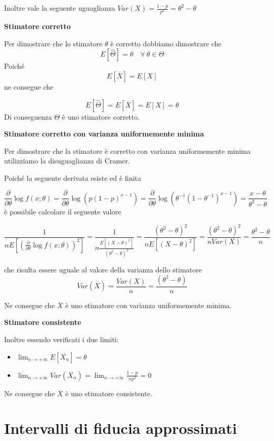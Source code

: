 \documentclass[]{book}
\providecommand{\tightlist}{%
  \setlength{\itemsep}{0pt}\setlength{\parskip}{0pt}}
\begin{document}
Inoltre vale la seguente uguaglianza
\(Var(X) = \frac{1-p}{p^2} = \theta^2 - \theta\)

\textbf{Stimatore corretto}

Per dimostrare che lo stimatore \(\theta\) è corretto dobbiamo
dimostrare che
\[E[\hat \Theta] = \theta \quad \forall \ \theta \in \Theta\] Poiché
\[E[\overline{X}] = E[X]\] ne consegue che

\[E[\hat \Theta] = E[\overline{X}] = E[X] = \theta\] Di conseguenza
\(\Theta\) è uno stimatore corretto.

\textbf{Stimatore corretto con varianza uniformemente minima}

Per dimostrare che la stimatore è corretto con varianza uniformemente
minima utilizziamo la disuguaglianza di Cramer.

Poiché la seguente derivata esiste ed è finita

\[\frac{\partial}{\partial \theta} \log f(x; \theta) = \frac{\partial}{\partial \theta} \log(p(1-p)^{x-1})= \frac{\partial}{\partial \theta} \log{(\theta^{-1}(1-\theta^{-1})^{x-1})} =\frac{x - \theta}{\theta^2 -  \theta}\]
è possibile calcolare il seguente valore

\[\frac{1}{n E \left[ \left( \frac{\partial}{\partial \theta} \log f(x;\theta) \right)^2\right]} = \frac{1}{n \frac{E[(X - \theta)^2]}{(\theta^2 -  \theta)^2}} = \frac{(\theta^2 -  \theta)^2 }{n E[(X - \theta)^2]} = \frac{(\theta^2 -  \theta)^2}{nVar(X)} =\frac{\theta^2 -  \theta}{n} \]

che risulta essere uguale al valore della varianza dello stimatore
\[Var(\overline{X}) = \frac{Var(X)}{n} =  \frac{(\theta^2 -  \theta)}{n}\]

Ne consegue che \(\overline{X}\) è uno stimatore con varianza
uniformemente minima.

\textbf{Stimatore consistente}

Inoltre essendo verificati i due limiti:

\begin{itemize}
\tightlist
\item
  \(\lim_{n \to +\infty} E[\overline{X_n}] = \theta\)
\item
  \(\lim_{n \to +\infty} Var(\overline{X_n}) = \lim_{n \to +\infty} \frac{1-p}{np^2} = 0\)
\end{itemize}

Ne consegue che \(\overline{X}\) è uno stimatore consistente.

\chapter{Intervalli di fiducia
approssimati}\label{intervalli-di-fiducia-approssimati}
\end{document}
